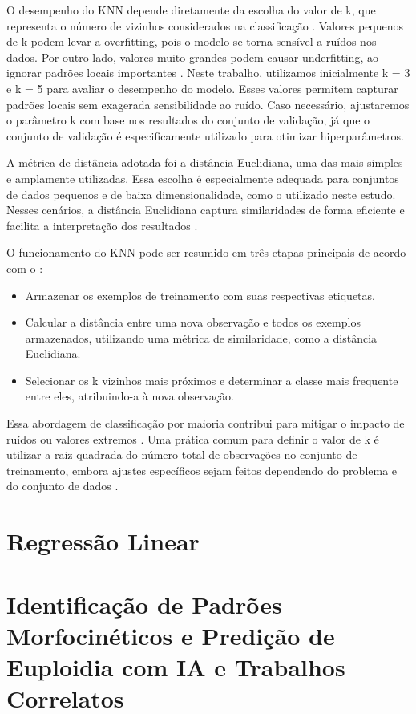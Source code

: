 O desempenho do KNN depende diretamente da escolha do valor de k, que representa o número de vizinhos considerados na classificação \cite{zhang2016}. Valores pequenos de k podem levar a overfitting, pois o modelo se torna sensível a ruídos nos dados. Por outro lado, valores muito grandes podem causar underfitting, ao ignorar padrões locais importantes \cite{elkan2011}. Neste trabalho, utilizamos inicialmente k = 3 e k = 5 para avaliar o desempenho do modelo. Esses valores permitem capturar padrões locais sem exagerada sensibilidade ao ruído. Caso necessário, ajustaremos o parâmetro k com base nos resultados do conjunto de validação, já que o conjunto de validação é especificamente utilizado para otimizar hiperparâmetros.

A métrica de distância adotada foi a distância Euclidiana, uma das mais simples e amplamente utilizadas. Essa escolha é especialmente adequada para conjuntos de dados pequenos e de baixa dimensionalidade, como o utilizado neste estudo. Nesses cenários, a distância Euclidiana captura similaridades de forma eficiente e facilita a interpretação dos resultados \cite{elkan2011}.

O funcionamento do KNN pode ser resumido em três etapas principais de acordo com o :
\begin{itemize}
    \item Armazenar os exemplos de treinamento com suas respectivas etiquetas.
    \item Calcular a distância entre uma nova observação e todos os exemplos armazenados, utilizando uma métrica de similaridade, como a distância Euclidiana.
    \item Selecionar os k vizinhos mais próximos e determinar a classe mais frequente entre eles, atribuindo-a à nova observação.
\end{itemize}

Essa abordagem de classificação por maioria contribui para mitigar o impacto de ruídos ou valores extremos \cite{elkan2011}. Uma prática comum para definir o valor de k é utilizar a raiz quadrada do número total de observações no conjunto de treinamento, embora ajustes específicos sejam feitos dependendo do problema e do conjunto de dados \cite{elkan2011}.

\section{Regressão Linear}

\section{Identificação de Padrões Morfocinéticos e Predição de Euploidia com IA e Trabalhos Correlatos}

